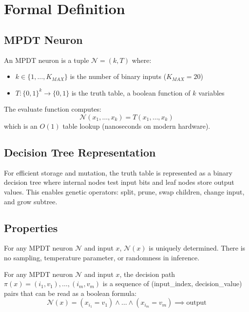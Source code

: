 \documentclass{article}
\begin{document}
\section{Formal Definition}

\subsection{MPDT Neuron}

An MPDT neuron is a tuple $\mathcal{N} = (k, T)$ where:
\begin{itemize}
    \item $k \in \{1, \ldots, K_{MAX}\}$ is the number of binary inputs ($K_{MAX}=20$)
    \item $T: \{0,1\}^k \to \{0,1\}$ is the truth table, a boolean function of $k$ variables
\end{itemize}

The evaluate function computes:
\[
\mathcal{N}(x_1, \ldots, x_k) = T(x_1, \ldots, x_k)
\]
which is an $O(1)$ table lookup (nanoseconds on modern hardware).

\subsection{Decision Tree Representation}

For efficient storage and mutation, the truth table is represented as a binary 
decision tree where internal nodes test input bits and leaf nodes store output 
values. This enables genetic operators: split, prune, swap children, change input, 
and grow subtree.

\subsection{Properties}

\begin{theorem}[Determinism]
For any MPDT neuron $\mathcal{N}$ and input $x$, $\mathcal{N}(x)$ is uniquely 
determined. There is no sampling, temperature parameter, or randomness in inference.
\end{theorem}

\begin{theorem}[Interpretability]
For any MPDT neuron $\mathcal{N}$ and input $x$, the decision path 
$\pi(x) = (i_1, v_1), \ldots, (i_m, v_m)$ is a sequence of (input\_index, 
decision\_value) pairs that can be read as a boolean formula:
\[
\mathcal{N}(x) = (x_{i_1} = v_1) \land \ldots \land (x_{i_m} = v_m) \implies \text{output}
\]
\end{theorem}
\end{document}
